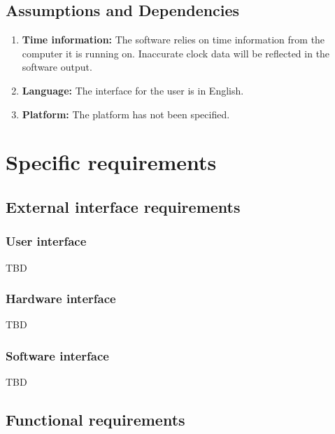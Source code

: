 \documentclass[12pt,a4paper]{article}
\begin{document}
\subsection{Assumptions and Dependencies}
\begin{enumerate}
\item \textbf{Time information:} The software relies on time information from the computer it is running on. Inaccurate clock data will be reflected in the software output. 
\item \textbf{Language:} The interface for the user is in English.
\item \textbf{Platform:} The platform has not been specified.
\end{enumerate}

\section{Specific requirements}

\subsection{External interface requirements}
\subsubsection{User interface}
TBD
\subsubsection{Hardware interface}
TBD
\subsubsection{Software interface}
TBD

\subsection{Functional requirements}
\end{document}
